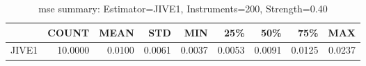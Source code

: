 \begin{table}[ht]
\centering
\caption{mse summary: Estimator=JIVE1, Instruments=200, Strength=0.40}
\begin{tabular}{lrrrrrrrr}
\toprule
 & COUNT & MEAN & STD & MIN & 25\% & 50\% & 75\% & MAX \\
\midrule
JIVE1 & 10.0000 & 0.0100 & 0.0061 & 0.0037 & 0.0053 & 0.0091 & 0.0125 & 0.0237 \\
\bottomrule
\end{tabular}
\end{table}
